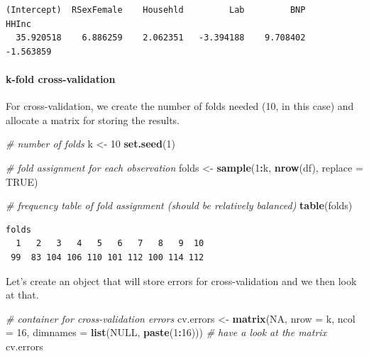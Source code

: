 \documentclass[]{article}
\newenvironment{Shaded}{\begin{snugshade}}{\end{snugshade}}
\newcommand{\CommentTok}[1]{\textcolor[rgb]{0.56,0.35,0.01}{\textit{#1}}}
\newcommand{\DataTypeTok}[1]{\textcolor[rgb]{0.13,0.29,0.53}{#1}}
\newcommand{\DecValTok}[1]{\textcolor[rgb]{0.00,0.00,0.81}{#1}}
\newcommand{\KeywordTok}[1]{\textcolor[rgb]{0.13,0.29,0.53}{\textbf{#1}}}
\newcommand{\NormalTok}[1]{#1}
\newcommand{\OperatorTok}[1]{\textcolor[rgb]{0.81,0.36,0.00}{\textbf{#1}}}
\newcommand{\OtherTok}[1]{\textcolor[rgb]{0.56,0.35,0.01}{#1}}
\newcommand{\StringTok}[1]{\textcolor[rgb]{0.31,0.60,0.02}{#1}}
\let\oldparagraph\paragraph
\renewcommand{\paragraph}[1]{\oldparagraph{#1}\mbox{}}
\begin{document}
\begin{verbatim}
(Intercept)  RSexFemale    Househld         Lab         BNP       HHInc 
  35.920518    6.886259    2.062351   -3.394188    9.708402   -1.563859 
\end{verbatim}

\hypertarget{k-fold-cross-validation-1}{%
\paragraph{k-fold cross-validation}\label{k-fold-cross-validation-1}}

For cross-validation, we create the number of folds needed (10, in this case) and allocate a matrix for storing the results.

\begin{Shaded}
\begin{Highlighting}[]
\CommentTok{# number of folds}
\NormalTok{k <-}\StringTok{ }\DecValTok{10}
\KeywordTok{set.seed}\NormalTok{(}\DecValTok{1}\NormalTok{)}

\CommentTok{# fold assignment for each observation}
\NormalTok{folds <-}\StringTok{ }\KeywordTok{sample}\NormalTok{(}\DecValTok{1}\OperatorTok{:}\NormalTok{k, }\KeywordTok{nrow}\NormalTok{(df), }\DataTypeTok{replace =} \OtherTok{TRUE}\NormalTok{)}

\CommentTok{# frequency table of fold assignment (should be relatively balanced)}
\KeywordTok{table}\NormalTok{(folds)}
\end{Highlighting}
\end{Shaded}

\begin{verbatim}
folds
  1   2   3   4   5   6   7   8   9  10 
 99  83 104 106 110 101 112 100 114 112 
\end{verbatim}

Let's create an object that will store errors for cross-validation and we then look at that.

\begin{Shaded}
\begin{Highlighting}[]
\CommentTok{# container for cross-validation errors}
\NormalTok{cv.errors <-}\StringTok{ }\KeywordTok{matrix}\NormalTok{(}\OtherTok{NA}\NormalTok{, }\DataTypeTok{nrow =}\NormalTok{ k, }\DataTypeTok{ncol =} \DecValTok{16}\NormalTok{, }\DataTypeTok{dimnames =} \KeywordTok{list}\NormalTok{(}\OtherTok{NULL}\NormalTok{, }\KeywordTok{paste}\NormalTok{(}\DecValTok{1}\OperatorTok{:}\DecValTok{16}\NormalTok{)))}
\CommentTok{# have a look at the matrix}
\NormalTok{cv.errors}
\end{Highlighting}
\end{Shaded}
\end{document}
